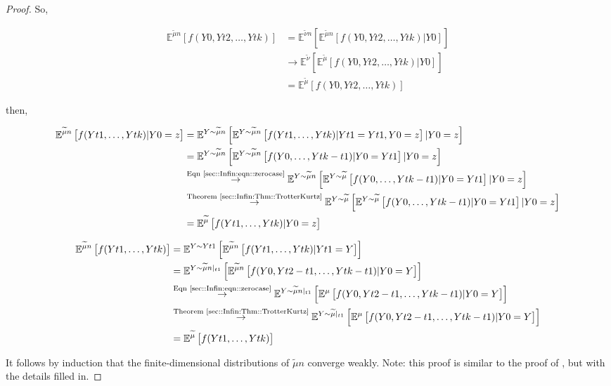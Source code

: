 \documentclass[12pt]{article}
\newcommand{\mb}{\mathbb}
\newcommand{\ra}{\rightarrow}
\newcommand{\os}{\overset}
\newcommand{\te}{\text}
\newcommand{\exmu}[2]{\mb{E}^{#1}\left[#2\right]}	%
\renewcommand{\t}{t}							%
\newcommand{\alt}[1]{\widetilde{#1}}			%
\newcommand{\m}{\mu}							%
\newcommand{\mm}{\nu}							%
\newcommand{\XX}{Y}								%
\renewcommand{\it}{k}							%
\begin{document}
\begin{proof}
So,

\begin{align*}
\exmu{\alt{\m}{n}}{f(\XX{}{0},\XX{}{\t{2}},\dots,\XX{}{\t{\it}})} &= \exmu{\alt{\mm}{n}}{\exmu{\alt{\m}{n}}{f(\XX{}{0},\XX{}{\t{2}},\dots,\XX{}{\t{\it}})|\XX{}{0}}}\\
&\ra \exmu{\alt{\mm}}{\exmu{\alt{\m}}{f(\XX{}{0},\XX{}{\t{2}},\dots,\XX{}{\t{\it}})|\XX{}{0}}}\\
&= \exmu{\alt{\m}}{f(\XX{}{0},\XX{}{\t{2}},\dots,\XX{}{\t{\it}})}
\end{align*}

then,

\begin{align*}
\exmu{\alt{\m}{n}}{f(\XX{}{\t{1}},\dots,\XX{}{\t{\it}})|\XX{}{0}=z}&=\exmu{\XX\sim\alt{\m}{n}}{\exmu{\XX\sim \alt{\m}{n}}{f(\XX{\t{1}},\dots,\XX{\t{\it}})|\XX{\t{1}}=\XX{}{\t{1}},\XX{0}=z}|\XX{}{0}=z}\\
&=\exmu{\XX\sim\alt{\m}{n}}{\exmu{\XX\sim \alt{\m}{n}}{f(\XX{0},\dots,\XX{\t{\it}-\t{1}})|\XX{0}=\XX{}{\t{1}}}|\XX{}{0}=z}\\
&\os{\te{Eqn \eqref{sec::Infin:eqn::zerocase}}}{\ra} \exmu{\XX\sim\alt{\m}{n}}{\exmu{\XX\sim \alt{\m}}{f(\XX{0},\dots,\XX{\t{\it}-\t{1}})|\XX{0}=\XX{}{\t{1}}}|\XX{}{0}=z}\\
&\os{\te{Theorem \ref{sec::Infin:Thm::TrotterKurtz}}}{\ra} \exmu{\XX\sim\alt{\m}}{\exmu{\XX\sim \alt{\m}}{f(\XX{0},\dots,\XX{\t{\it}-\t{1}})|\XX{0}=\XX{}{\t{1}}}|\XX{}{0}=z}\\
&=\exmu{\alt{\m}}{f(\XX{}{\t{1}},\dots,\XX{}{\t{\it}})|\XX{}{0}=z}
\end{align*}

\begin{align*}
\exmu{\alt{\m}{n}}{f(\XX{}{\t{1}},\dots,\XX{}{\t{\it}})}&= \exmu{\XX\sim \XX{}{\t{1}}}{\exmu{\alt{\m}{n}}{f(\XX{}{\t{1}},\dots,\XX{}{\t{\it}})|\XX{}{\t{1}}=\XX}}\\
&=\exmu{\XX\sim \alt{\m}{n}|_{\t{1}}}{\exmu{\alt{\m}{n}}{f(\XX{}{0},\XX{\t{2}-\t{1}},\dots,\XX{\t{\it}-\t{1}})|\XX{}{0}=\XX}}\\
&\os{\te{Eqn \eqref{sec::Infin:eqn::zerocase}}}{\ra} \exmu{\XX\sim \alt{\m}{n}|_{\t{1}}}{\exmu{\m}{f(\XX{}{0},\XX{\t{2}-\t{1}},\dots,\XX{\t{\it}-\t{1}})|\XX{}{0}=\XX}}\\
&\os{\te{Theorem \ref{sec::Infin:Thm::TrotterKurtz}}}{\ra} \exmu{\XX\sim \alt{\m}|_{\t{1}}}{\exmu{\m}{f(\XX{}{0},\XX{\t{2}-\t{1}},\dots,\XX{\t{\it}-\t{1}})|\XX{}{0}=\XX}}\\
&=\exmu{\alt{\m}}{f(\XX{}{\t{1}},\dots,\XX{}{\t{\it}})}
\end{align*}

It follows by induction that the finite-dimensional distributions of \(\alt{\m}{n}\) converge weakly. Note: this proof is similar to the proof of \cite[Theorem 4.2]{Kur81}, but with the details filled in.
\end{proof}
\end{document}
